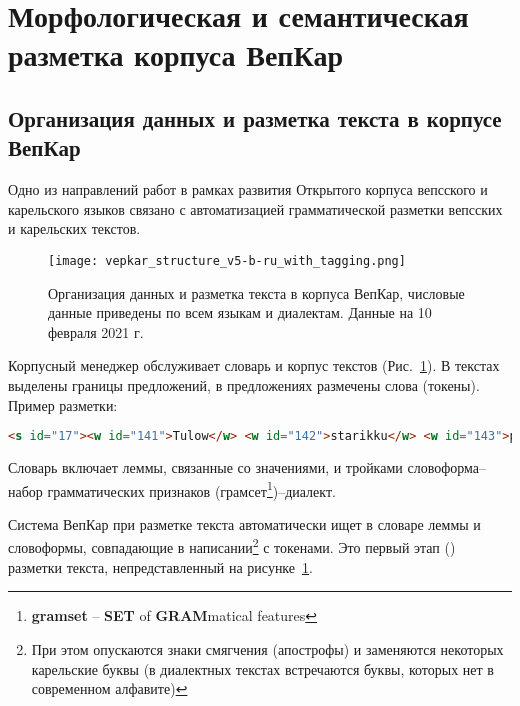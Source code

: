 \section{Морфологическая и семантическая разметка корпуса ВепКар} \label{sect_exp_tag_vepkar}

\subsection{Организация данных и разметка текста в корпусе ВепКар} \label{sect_exp_tag_vepkar_data_org}

Одно из направлений работ в рамках развития Открытого корпуса вепсского и карельского языков связано с автоматизацией грамматической разметки вепсских и карельских текстов. 

\begin{figure}
    \centering
    \texttt{[image: vepkar\_structure\_v5-b-ru\_with\_tagging.png]}
\caption{Организация данных и разметка текста в корпуса ВепКар, 
числовые данные приведены по всем языкам и диалектам. Данные на 10 февраля 2021 г.} \label{fig:corpus_manager_tagging}
\end{figure}

Корпусный менеджер обслуживает  словарь и корпус текстов (Рис.~\ref{fig:corpus_manager_tagging}). В текстах выделены границы предложений, в предложениях размечены слова (токены).  Пример разметки:
\begin{lstlisting}[language=HTML]
<s id="17"><w id="141">Tulow</w> <w id="142">starikku</w> <w id="143">pertih</w>, <w id="144">tuattah</w> <w id="145">se</w>.</s>
\end{lstlisting}

Словарь включает леммы, связанные со значениями, и тройками словоформа--набор грамматических признаков (грамсет\footnote{ \textbf{gramset} -- \textbf{SET} of \textbf{GRAM}matical features})--диалект. 

Система ВепКар при разметке текста автоматически ищет в словаре леммы и словоформы, совпадающие в написании\footnote{ При этом опускаются знаки смягчения (апострофы) и заменяются некоторых карельские буквы (в диалектных текстах встречаются буквы, которых нет в современном алфавите)} с токенами. Это первый этап () разметки текста, непредставленный на рисунке~\ref{fig:corpus_manager_tagging}.  

